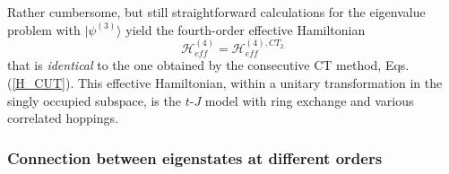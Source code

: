 \documentclass[floatfix,twocolumn,aps,prb,showpacs,superscriptaddress]{revtex4}
\begin{document}
Rather cumbersome, but still straightforward calculations for the eigenvalue
problem with $|\psi ^{(3)}\rangle $ yield the fourth-order effective
Hamiltonian 
\begin{equation}
\mathcal{H}_{eff}^{(4)}=\mathcal{H}_{eff}^{(4),CT_{2}}  \label{Heff4}
\end{equation}%
%
%
%
%
that is \textit{identical} to the one obtained by the consecutive CT method,
Eqs.(\ref{H_CUT}). This effective Hamiltonian, within a unitary
transformation in the singly occupied subspace, is the $t$-$J$ model with
ring exchange and various correlated hoppings.\cite{Girvin:1989}




\subsubsection{Connection between eigenstates at different orders}


\label{EigenstatesLink}


\end{document}
